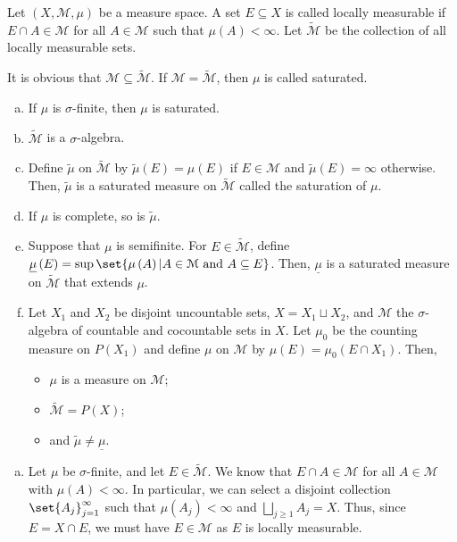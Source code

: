 \documentclass[10pt]{mypackage}
\begin{document}
\begin{exercise}
  Let $\left(X,\mathcal{M},\mu\right)$ be a measure space. A set $E\subseteq X$ is called locally measurable if $E\cap A \in \mathcal{M}$ for all $A\in \mathcal{M}$ such that $\mu\left(A\right) < \infty$. Let $\widetilde{\mathcal{M}}$ be the collection of all locally measurable sets.\newline

  It is obvious that $\mathcal{M}\subseteq \widetilde{\mathcal{M}}$. If $\mathcal{M} = \widetilde{\mathcal{M}}$, then $\mu$ is called saturated.
  \begin{enumerate}[(a)]
    \item If $\mu$ is $\sigma$-finite, then $\mu$ is saturated.
    \item $\widetilde{\mathcal{M}}$ is a $\sigma$-algebra.
    \item Define $\widetilde{\mu}$ on $\widetilde{\mathcal{M}}$ by $ \widetilde{\mu}\left(E\right) = \mu\left(E\right) $ if $E\in \mathcal{M}$ and $ \widetilde{\mu}\left(E\right) = \infty $ otherwise. Then, $\widetilde{\mu}$ is a saturated measure on $\widetilde{\mathcal{M}}$ called the saturation of $\mu$.
    \item If $\mu$ is complete, so is $\widetilde{\mu}$.
    \item Suppose that $\mu$ is semifinite. For $E\in \widetilde{\mathcal{M}}$, define $\underline{\mu}\left(E\right) = \sup\set{\mu\left(A\right) | A\in \mathcal{M}\text{ and }A\subseteq E}$. Then, $\underline{\mu}$ is a saturated measure on $\widetilde{\mathcal{M}}$ that extends $\mu$.
    \item Let $X_1$ and $X_2$ be disjoint uncountable sets, $X = X_1\sqcup X_2$, and $\mathcal{M}$ the $\sigma$-algebra of countable and cocountable sets in $X$. Let $\mu_0$ be the counting measure on $P\left(X_1\right)$ and define $\mu$ on $\mathcal{M}$ by $\mu\left(E\right) = \mu_0\left(E\cap X_1\right)$. Then, 
      \begin{itemize}
        \item $\mu$ is a measure on $\mathcal{M}$;
        \item $\widetilde{\mathcal{M}} = P(X)$;
        \item and $\widetilde{\mu}\neq \underline{\mu}$.
      \end{itemize}
  \end{enumerate}
\end{exercise}
\begin{solution}\hfill
  \begin{enumerate}[(a)]
    \item Let $\mu$ be $\sigma$-finite, and let $E\in \widetilde{\mathcal{M}}$. We know that $E\cap A\in \mathcal{M}$ for all $A\in \mathcal{M}$ with $\mu(A) < \infty$. In particular, we can select a disjoint collection $\set{A_j}_{j=1}^{\infty}$ such that $\mu\left(A_j\right) < \infty$ and $\bigsqcup_{j\geq 1}A_j = X$. Thus, since $E = X\cap E$, we must have $E\in \mathcal{M}$ as $E$ is locally measurable.
  \end{enumerate}
\end{solution}
\end{document}
